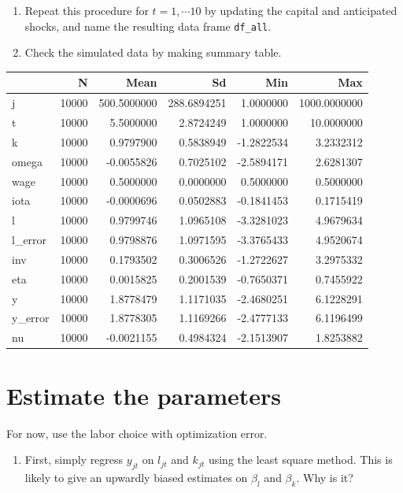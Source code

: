\documentclass[
]{book}
\providecommand{\tightlist}{%
  \setlength{\itemsep}{0pt}\setlength{\parskip}{0pt}}
\begin{document}
\begin{enumerate}
\def\labelenumi{\arabic{enumi}.}
\setcounter{enumi}{8}
\item
  Repeat this procedure for \(t = 1, \cdots 10\) by updating the capital and anticipated shocks, and name the resulting data frame \texttt{df\_all}.
\item
  Check the simulated data by making summary table.
\end{enumerate}

\begin{tabular}{l|r|r|r|r|r}
\hline
  & N & Mean & Sd & Min & Max\\
\hline
j & 10000 & 500.5000000 & 288.6894251 & 1.0000000 & 1000.0000000\\
\hline
t & 10000 & 5.5000000 & 2.8724249 & 1.0000000 & 10.0000000\\
\hline
k & 10000 & 0.9797900 & 0.5838949 & -1.2822534 & 3.2332312\\
\hline
omega & 10000 & -0.0055826 & 0.7025102 & -2.5894171 & 2.6281307\\
\hline
wage & 10000 & 0.5000000 & 0.0000000 & 0.5000000 & 0.5000000\\
\hline
iota & 10000 & -0.0000696 & 0.0502883 & -0.1841453 & 0.1715419\\
\hline
l & 10000 & 0.9799746 & 1.0965108 & -3.3281023 & 4.9679634\\
\hline
l\_error & 10000 & 0.9798876 & 1.0971595 & -3.3765433 & 4.9520674\\
\hline
inv & 10000 & 0.1793502 & 0.3006526 & -1.2722627 & 3.2975332\\
\hline
eta & 10000 & 0.0015825 & 0.2001539 & -0.7650371 & 0.7455922\\
\hline
y & 10000 & 1.8778479 & 1.1171035 & -2.4680251 & 6.1228291\\
\hline
y\_error & 10000 & 1.8778305 & 1.1169266 & -2.4777133 & 6.1196499\\
\hline
nu & 10000 & -0.0021155 & 0.4984324 & -2.1513907 & 1.8253882\\
\hline
\end{tabular}

\hypertarget{estimate-the-parameters}{%
\section{Estimate the parameters}\label{estimate-the-parameters}}

For now, use the labor choice with optimization error.

\begin{enumerate}
\def\labelenumi{\arabic{enumi}.}
\tightlist
\item
  First, simply regress \(y_{jt}\) on \(l_{jt}\) and \(k_{jt}\) using the least square method. This is likely to give an upwardly biased estimates on \(\beta_l\) and \(\beta_k\). Why is it?
\end{enumerate}
\end{document}
